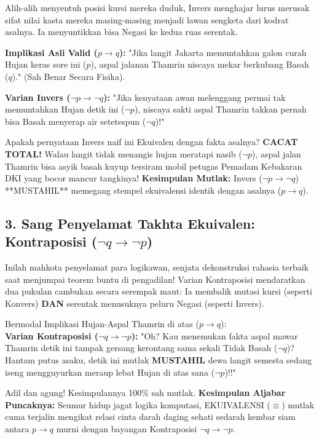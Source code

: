 Alih-alih menyentuh posisi kursi mereka duduk, Invers menghajar lurus merusak sifat nilai kasta mereka masing-masing menjadi lawan sengketa dari kodrat asalnya. Ia menyuntikkan bisa Negasi ke kedua ruas serentak.

\begin{contoh}
\textbf{Implikasi Asli Valid ($p \rightarrow q$):} "Jika langit Jakarta memuntahkan galon curah Hujan keras sore ini ($p$), aspal jalanan Thamrin niscaya mekar berkubang Basah ($q$)." (Sah Benar Secara Fisika).

\textbf{Varian Invers ($\neg p \rightarrow \neg q$):} "Jika kenyataan awan melenggang permai tak memuntahkan Hujan detik ini ($\neg p$), niscaya sakti aspal Thamrin takkan pernah bisa Basah menyerap air setetespun ($\neg q$)!" 

Apakah pernyataan Invers naif ini Ekuivalen dengan fakta asalnya? \textbf{CACAT TOTAL!} Walau langit tidak menangis hujan meratapi nasib ($\neg p$), aspal jalan Thamrin bisa asyik basah kuyup tersiram mobil petugas Pemadam Kebakaran DKI yang bocor mancur tangkinya! 
\textbf{Kesimpulan Mutlak:} Invers ($\neg p \rightarrow \neg q$) **MUSTAHIL** memegang stempel ekuivalensi identik dengan asalnya ($p \rightarrow q$). \cite{wiki_first_order_logic}
\end{contoh}

\subsection{3. Sang Penyelamat Takhta Ekuivalen: Kontraposisi ($\neg q \rightarrow \neg p$)}

Inilah mahkota penyelamat para logikawan, senjata dekonstruksi rahasia terbaik saat menjumpai teorem buntu di pengadilan! Varian Kontraposisi mendaratkan dua pukulan cambukan secara serempak maut: Ia membalik mutasi kursi (seperti Konvers) \textbf{DAN} serentak menusuknya peluru Negasi (seperti Invers).

\begin{contoh}
Bermodal Implikasi Hujan-Aspal Thamrin di atas ($p \rightarrow q$): \\
\textbf{Varian Kontraposisi ($\neg q \rightarrow \neg p$):} "Oh? Kau menemukan fakta aspal mawar Thamrin detik ini tampak gersang kerontang sama sekali Tidak Basah ($\neg q$)? Hantam putus asaku, detik ini mutlak \textbf{MUSTAHIL} dewa langit semesta sedang iseng mengguyurkan meraup lebat Hujan di atas sana ($\neg p$)!!"

Adil dan agung! Kesimpulannya 100\% sah mutlak.
\textbf{Kesimpulan Aljabar Puncaknya:} Seumur hidup jagat logika komputasi, EKUIVALENSI ($\equiv$) mutlak cuma terjalin mengikat relasi cinta darah daging sehati sedarah kembar siam antara $p \rightarrow q$ murni dengan bayangan Kontraposisi $\neg q \rightarrow \neg p$. 
\end{contoh}

